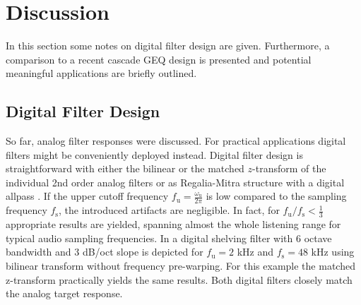 \section{Discussion}
\label{sec:discussion}
%
In this section some notes on digital filter design are given.
%
Furthermore, a comparison to a recent cascade GEQ design is presented
and potential meaningful applications are briefly outlined.

\subsection{Digital Filter Design}
\label{sec:digital_filter}
%
So far, analog filter responses were discussed.
%
For practical applications digital filters might be conveniently deployed
instead.
%
Digital filter design is straightforward with either the bilinear or the
matched $z$-transform of the individual 2nd order
analog filters \cite{Ifeachor2002,Berners2003,Nielsen2016}
or as Regalia-Mitra structure with a digital allpass \cite{Jot2015}.
%
If the upper cutoff frequency $f_\mathrm{u} = \frac{\omega_\mathrm{u}}{2\pi}$ is low
compared to the sampling frequency $f_\mathrm{s}$, the introduced artifacts are negligible.
%
In fact, for $f_\mathrm{u} / f_\mathrm{s} < \frac{1}{3}$ appropriate results are yielded,
spanning almost the whole listening range for typical audio sampling frequencies.
%
In  a digital shelving filter
with 6 octave bandwidth and 3 dB/oct slope is depicted for
$f_\mathrm{u}=2$ kHz and $f_\mathrm{s}=48$ kHz using bilinear transform without
frequency pre-warping.
%
For this example the matched z-transform practically yields the same results.
%
Both digital filters closely match the analog target response.
%
%
%
%
%

